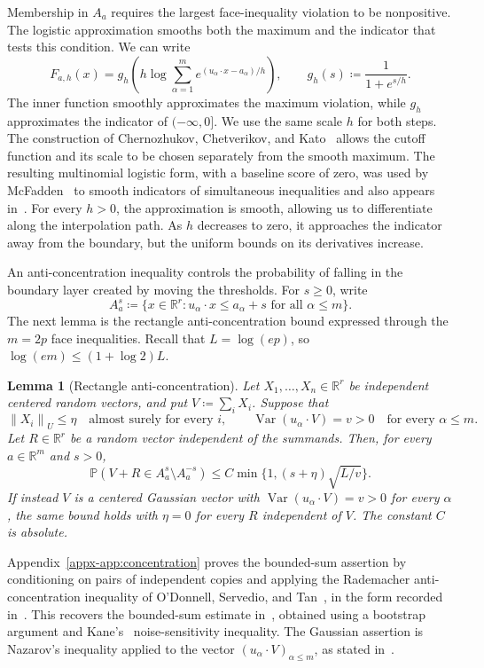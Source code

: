 \documentclass[11pt,letterpaper]{article}
\newtheorem{lemma}{Lemma}
\theoremstyle{remark}
\newcommand{\Pp}{\mathbb P}
\newcommand{\R}{\mathbb R}
\newcommand{\Var}{\operatorname{Var}}
\newcommand{\norm}[1]{\left\lVert#1\right\rVert}
\begin{document}
Membership in \(A_a\) requires the largest face-inequality violation
to be nonpositive. The logistic approximation smooths both the maximum
and the indicator that tests this condition. We can write
\[
 F_{a,h}(x)=g_h\!\left(h\log\sum_{\alpha=1}^m
 e^{(u_\alpha\cdot x-a_\alpha)/h}\right),
 \qquad g_h(s)\coloneqq\frac1{1+e^{s/h}}.
\]
The inner function smoothly approximates the maximum violation, while
\(g_h\) approximates the indicator of \(({-\infty},0]\). We use the
same scale \(h\) for both steps. The construction of Chernozhukov,
Chetverikov, and Kato~\cite{CCK2013} allows the cutoff function and
its scale to be chosen separately from the smooth maximum. The
resulting multinomial logistic form, with a baseline score of zero,
was used by McFadden~\cite[p.~1001]{McFadden1989} to smooth indicators
of simultaneous inequalities and also appears in~\cite[eq.~(5)]{GaoZhang}.
For every \(h>0\), the approximation is smooth, allowing us to
differentiate along the interpolation path. As \(h\) decreases to
zero, it approaches the indicator away from the boundary, but the
uniform bounds on its derivatives increase.

An anti-concentration inequality controls the probability of falling
in the boundary layer created by moving the thresholds. For $s\ge0$, write
\[
 A_a^s\coloneqq\{x\in\mathbb R^r:u_\alpha\cdot x\le a_\alpha+s
                         \text{ for all }\alpha\le m\}.
\]
The next lemma is the rectangle anti-concentration bound expressed
through the \(m=2p\) face inequalities. Recall that \(L=\log(ep)\),
so \(\log(em)\le(1+\log2)L\).
\begin{lemma}[Rectangle anti-concentration]\label{lem:concentration}
Let \(X_1,\ldots,X_n\in\R^r\) be independent centered random
vectors, and put \(V\coloneqq\sum_iX_i\). Suppose that
\[
 \norm{X_i}_U\le\eta\quad\text{almost surely for every }i,
 \qquad \Var(u_\alpha\cdot V)=v>0
                   \quad\text{for every }\alpha\le m.
\]
Let \(R\in\R^r\) be a random vector independent of the summands.
Then, for every \(a\in\R^m\) and \(s>0\),
\[
 \Pp(V+R\in A_a^s\setminus A_a^{-s})
 \le C\min\{1,(s+\eta)\sqrt{L/v}\}.
\]
If instead \(V\) is a centered Gaussian vector with
\(\Var(u_\alpha\cdot V)=v>0\) for every \(\alpha\), the same
bound holds with \(\eta=0\) for every \(R\) independent of \(V\).
The constant \(C\) is absolute.
\end{lemma}
Appendix~\ref{appx-app:concentration} proves the bounded-sum assertion
by conditioning on pairs of independent copies and applying the
Rademacher anti-concentration inequality of O'Donnell, Servedio,
and Tan~\cite{OST}, in the form recorded
in~\cite[Lemma~J.4]{CCKK2022}. This recovers the bounded-sum estimate
in~\cite[Lemma~2.1]{AL}, obtained using a bootstrap argument and
Kane's~\cite{Kane} noise-sensitivity inequality. The Gaussian assertion
is Nazarov's inequality applied to the vector
\((u_\alpha\cdot V)_{\alpha\le m}\), as stated
in~\cite[Lemma~A.1]{CCK2017}.
\end{document}
